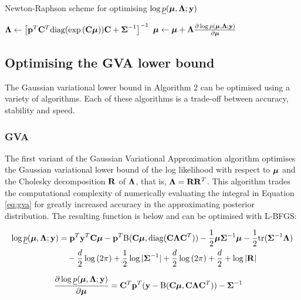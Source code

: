 \documentclass{article}[12pt]
\begin{document}
\begin{algorithm}\label{alg:algorithm_three}
\caption[Algorithm 3]{Newton-Raphson scheme for optimising $\log \underline{p}({\boldsymbol \mu}, {\boldsymbol \Lambda}; {\bf y})$}
\begin{algorithmic}
\STATE ${\boldsymbol \Lambda} \leftarrow \left [{\bf p}^T {\bf C}^T \text{diag}(\exp{({\bf C}{\boldsymbol\mu})}) {\bf C} + {\boldsymbol \Sigma}^{-1} \right ]^{-1}$
\STATE ${\boldsymbol \mu} \leftarrow {\boldsymbol\mu} + {\boldsymbol \Lambda} \frac{\partial \log p({\boldsymbol \mu}, {\boldsymbol \Lambda}; {\bf y})}{\partial {\boldsymbol\mu}}$
\ENDWHILE
\end{algorithmic}
\end{algorithm}

\subsection{Optimising the GVA lower bound}
The Gaussian variational lower bound in Algorithm 2 can be optimised using a 
variety of algorithms. Each of these algorithms is a trade-off between accuracy, 
stability and speed.

\subsubsection{GVA}
The first variant of the Gaussian Variational Approximation algorithm
optimises the Gaussian variational lower bound of the log likelihood with respect
to ${\boldsymbol \mu}$ and the Cholesky decomposition ${\bf R}$ of ${\boldsymbol \Lambda}$, that is,
${\boldsymbol \Lambda} = {\bf R} {\bf R}^T$. This algorithm trades the computational complexity of 
numerically evaluating the integral in Equation \ref{eq:gva} for greatly increased 
accuracy in the approximating posterior distribution. The resulting function is below and 
can be optimised with L-BFGS:

\begin{align}\label{eq:gva}
\log \underline{p}({\boldsymbol \mu}, {\boldsymbol \Lambda}; {\bf y}) &= {\bf p}^T{\bf y}^T{\bf C} {\boldsymbol \mu} - {\bf p}^T {\text{B}}({\bf C} {\boldsymbol \mu}, \text{diag}({\bf C} {\boldsymbol \Lambda} {\bf C}^T)) - {\frac{1}{2}} {\boldsymbol \mu} {\boldsymbol \Sigma}^{-1} {\boldsymbol \mu} - {\frac{1}{2}} \text{tr}{({\boldsymbol\Sigma}^{-1} {\boldsymbol\Lambda})} \\
&\quad - \frac{d}{2} \log{(2 \pi)} + {\frac{1}{2}} \log{|{\boldsymbol\Sigma}^{-1}|} + \frac{d}{2} \log{(2 \pi)} + \frac{d}{2} + \log{|{\bf R}|}
\end{align}

\begin{align*}
\frac{\partial \log \underline{p}({\boldsymbol \mu}, {\boldsymbol \Lambda}; {\bf y})}{\partial {\boldsymbol\mu}} &= {\bf C}^T {\bf p}^T({\bf y} - {\text{B}}({\bf C} {\boldsymbol \mu}, {\bf C} {\boldsymbol \Lambda} {\bf C}^T)) - {\boldsymbol \Sigma}^{-1}
\end{align*}
\end{document}
